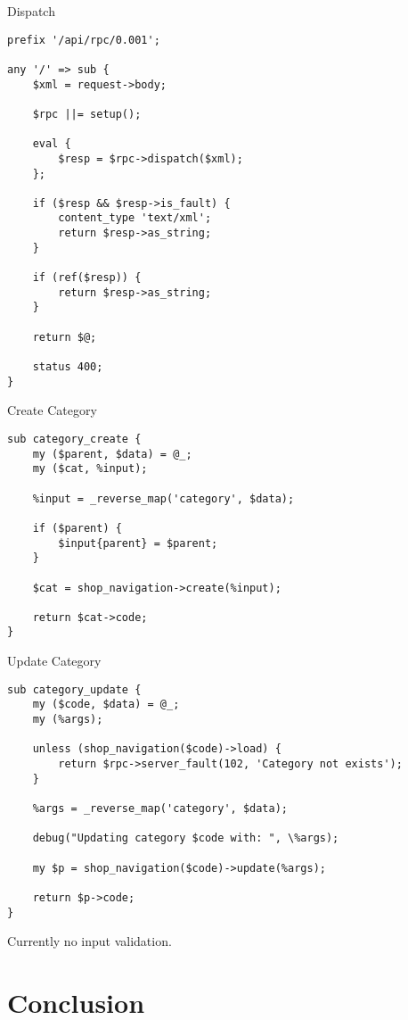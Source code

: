 \begin{frame}[fragile]{Dispatch}
\begin{lstlisting}
prefix '/api/rpc/0.001';

any '/' => sub {
    $xml = request->body;

    $rpc ||= setup();

    eval {
        $resp = $rpc->dispatch($xml);
    };

    if ($resp && $resp->is_fault) {
        content_type 'text/xml';
        return $resp->as_string;
    }

    if (ref($resp)) {
        return $resp->as_string;
    }

    return $@;
    
    status 400;
}
\end{lstlisting}
\end{frame}

\begin{frame}[fragile]{Create Category}
\begin{lstlisting}
sub category_create {
    my ($parent, $data) = @_;
    my ($cat, %input);

    %input = _reverse_map('category', $data);

    if ($parent) {
        $input{parent} = $parent;
    }

    $cat = shop_navigation->create(%input);

    return $cat->code;
}
\end{lstlisting}
\end{frame}

\begin{frame}[fragile]{Update Category}
\begin{lstlisting}
sub category_update {
    my ($code, $data) = @_;
    my (%args);

    unless (shop_navigation($code)->load) {
        return $rpc->server_fault(102, 'Category not exists');
    }

    %args = _reverse_map('category', $data);
    
    debug("Updating category $code with: ", \%args);

    my $p = shop_navigation($code)->update(%args);

    return $p->code;
}
\end{lstlisting}
\end{frame}

Currently no input validation.

\section{Conclusion}

